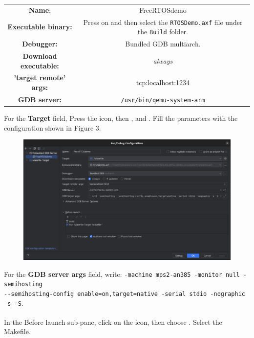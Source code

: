 \documentclass[10pt]{article}
\begin{document}
\begin{center}
\begin{tabular}{ c c }
 \textbf{Name}: & FreeRTOSdemo  \\ 
 \textbf{Executable binary:} & Press on \tcboxverb{...} and then select the \verb|RTOSDemo.axf| file under the \verb|Build| folder. \\
 \textbf{Debugger:} & Bundled GDB multiarch. \\
 \textbf{Download executable:} & \textit{always} \\
 \textbf{'target remote' args:} & tcp:localhost:1234 \\
 \textbf{GDB server:} & \verb|/usr/bin/qemu-system-arm| \\
\end{tabular}
\end{center}

For the \textbf{Target} field, Press the  icon, then , and . Fill the parameters with the configuration shown in Figure 3. \\  

\begin{figure}[H]
    \centering
    \includegraphics[width=1.0\linewidth]{Pictures/2.png}
    \caption{}
    \label{fig:22}
\end{figure}


For the \textbf{GDB server args} field, write: \verb|-machine mps2-an385 -monitor null -semihosting|\\
\verb|--semihosting-config enable=on,target=native -serial stdio -nographic -s -S|.\\\\
In the Before launch sub-pane, click on the \tcboxverb{+} icon, then choose . Select the Makefile.\\
\end{document}

